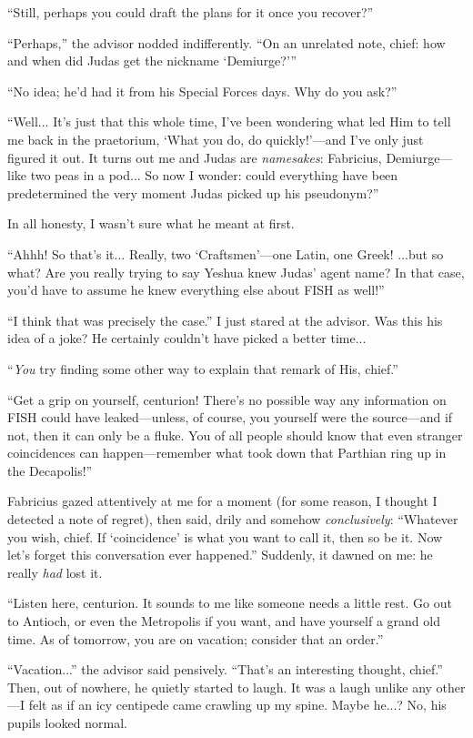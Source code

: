 ``Still, perhaps you could draft the plans for it once you recover?''

``Perhaps,'' the advisor nodded indifferently. ``On an unrelated note, chief: how and when did Judas get the nickname `Demiurge?'''

``No idea; he'd had it from his Special Forces days. Why do you ask?''

``Well... It's just that this whole time, I've been wondering what led Him to tell me back in the praetorium, `What you do, do quickly!'---and I've only just figured it out. It turns out me and Judas are \emph{namesakes}: Fabricius, Demiurge---like two peas in a pod... So now I wonder: could everything have been predetermined the very moment Judas picked up his pseudonym?''

In all honesty, I wasn't sure what he meant at first.

``Ahhh! So that's it... Really, two `Craftsmen'---one Latin, one Greek! ...but so what? Are you really trying to say Yeshua knew Judas' agent name? In that case, you'd have to assume he knew everything else about FISH as well!''

``I think that was precisely the case.'' I just stared at the advisor. Was this his idea of a joke? He certainly couldn't have picked a better time...

``\emph{You} try finding some other way to explain that remark of His, chief.''

``Get a grip on yourself, centurion! There's no possible way any information on FISH could have leaked---unless, of course, you yourself were the source---and if not, then it can only be a fluke. You of all people should know that even stranger coincidences can happen---remember what took down that Parthian ring up in the Decapolis!''

Fabricius gazed attentively at me for a moment (for some reason, I thought I detected a note of regret), then said, drily and somehow \emph{conclusively}: ``Whatever you wish, chief. If `coincidence' is what you want to call it, then so be it. Now let's forget this conversation ever happened.'' Suddenly, it dawned on me: he really \emph{had} lost it.

``Listen here, centurion. It sounds to me like someone needs a little rest. Go out to Antioch, or even the Metropolis if you want, and have yourself a grand old time. As of tomorrow, you are on vacation; consider that an order.''

``Vacation...'' the advisor said pensively. ``That's an interesting thought, chief.'' Then, out of nowhere, he quietly started to laugh. It was a laugh unlike any other---I felt as if an icy centipede came crawling up my spine. Maybe he...? No, his pupils looked normal.

